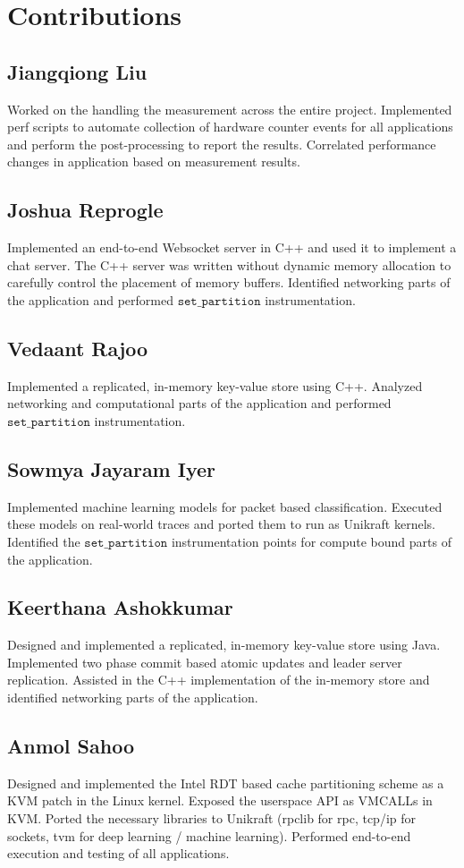 \documentclass[sigconf,authorversion,noacm]{acmart}
\begin{document}
\appendix

\section{Contributions}

\subsection{Jiangqiong Liu}
Worked on the handling the measurement across the entire project. Implemented
perf scripts to automate collection of hardware counter events for all
applications and perform the post-processing to report the results. Correlated
performance changes in application based on measurement results.

\subsection{Joshua Reprogle}
Implemented an end-to-end Websocket server in C++ and used it to implement a
chat server. The C++ server was written without dynamic memory allocation to
carefully control the placement of memory buffers. Identified networking parts
of the application and performed $\texttt{set\_partition}$ instrumentation.

\subsection{Vedaant Rajoo}
Implemented a replicated, in-memory key-value store using C++. Analyzed
networking and computational parts of the application and performed
$\texttt{set\_partition}$ instrumentation.

\subsection{Sowmya Jayaram Iyer}
Implemented machine learning models for packet based classification. Executed
these models on real-world traces and ported them to run as Unikraft kernels.
Identified the $\texttt{set\_partition}$ instrumentation points for compute
bound parts of the application.

\subsection{Keerthana Ashokkumar}
Designed and implemented a replicated, in-memory key-value store using Java.
Implemented two phase commit based atomic updates and leader server replication.
Assisted in the C++ implementation of the in-memory store and identified
networking parts of the application.

\subsection{Anmol Sahoo}
Designed and implemented the Intel RDT based cache partitioning scheme as a KVM
patch in the Linux kernel. Exposed the userspace API as VMCALLs in KVM. Ported
the necessary libraries to Unikraft (rpclib for rpc, tcp/ip for sockets, tvm for
deep learning / machine learning). Performed end-to-end execution and testing of
all applications.
\end{document}
